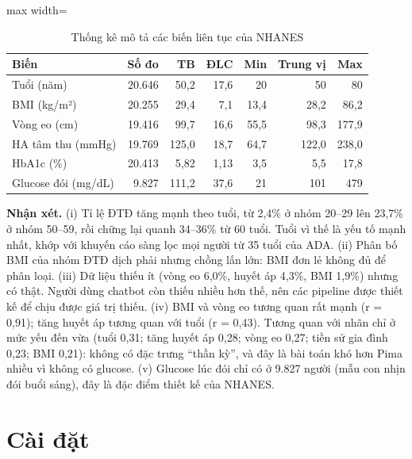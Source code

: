 \begin{table}[H]
\centering
\caption{Thống kê mô tả các biến liên tục của NHANES}
\label{tab:nhanes-desc}
\small
\begin{adjustbox}{max width=\linewidth}
\begin{tabular}{@{}lrrrrrr@{}}
\toprule
\textbf{Biến} & \textbf{Số đo} & \textbf{TB} & \textbf{ĐLC} & \textbf{Min} & \textbf{Trung vị} & \textbf{Max} \\
\midrule
Tuổi (năm) & 20.646 & 50,2 & 17,6 & 20 & 50 & 80 \\
BMI (kg/m²) & 20.255 & 29,4 & 7,1 & 13,4 & 28,2 & 86,2 \\
Vòng eo (cm) & 19.416 & 99,7 & 16,6 & 55,5 & 98,3 & 177,9 \\
HA tâm thu (mmHg) & 19.769 & 125,0 & 18,7 & 64,7 & 122,0 & 238,0 \\
HbA1c (\%) & 20.413 & 5,82 & 1,13 & 3,5 & 5,5 & 17,8 \\
Glucose đói (mg/dL) & 9.827 & 111,2 & 37,6 & 21 & 101 & 479 \\
\bottomrule
\end{tabular}
\end{adjustbox}
\end{table}



\textbf{Nhận xét.} (i) Tỉ lệ ĐTĐ tăng mạnh theo tuổi, từ 2,4\% ở nhóm 20–29 lên 23,7\% ở nhóm 50–59, rồi chững lại quanh 34–36\% từ 60 tuổi. Tuổi vì thế là yếu tố mạnh nhất, khớp với khuyến cáo sàng lọc mọi người từ 35 tuổi của ADA. (ii) Phân bố BMI của nhóm ĐTĐ dịch phải nhưng chồng lấn lớn: BMI đơn lẻ không đủ để phân loại. (iii) Dữ liệu thiếu ít (vòng eo 6,0\%, huyết áp 4,3\%, BMI 1,9\%) nhưng có thật. Người dùng chatbot còn thiếu nhiều hơn thế, nên các pipeline được thiết kế để chịu được giá trị thiếu. (iv) BMI và vòng eo tương quan rất mạnh (r = 0,91); tăng huyết áp tương quan với tuổi (r = 0,43). Tương quan với nhãn chỉ ở mức yếu đến vừa (tuổi 0,31; tăng huyết áp 0,28; vòng eo 0,27; tiền sử gia đình 0,23; BMI 0,21): không có đặc trưng ``thần kỳ'', và đây là bài toán khó hơn Pima nhiều vì không có glucose. (v) Glucose lúc đói chỉ có ở 9.827 người (mẫu con nhịn đói buổi sáng), đây là đặc điểm thiết kế của NHANES.

\section{Cài đặt}

